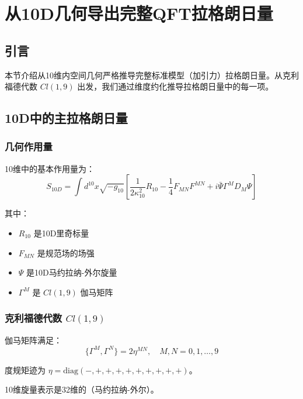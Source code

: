 \section{从10D几何导出完整QFT拉格朗日量}
\label{sec:qft_lagrangian_complete}

\subsection{引言}

本节介绍从10维内空间几何严格推导完整标准模型（加引力）拉格朗日量。从克利福德代数 $Cl(1,9)$ 出发，我们通过维度约化推导拉格朗日量中的每一项。

\subsection{10D中的主拉格朗日量}

\subsubsection{几何作用量}

10维中的基本作用量为：
\begin{equation}
    S_{10D} = \int d^{10}x \sqrt{-g_{10}} \left[ \frac{1}{2\kappa_{10}^2}R_{10} - \frac{1}{4}F_{MN}F^{MN} + i\bar{\Psi}\Gamma^M D_M \Psi \right]
\end{equation}

其中：
\begin{itemize}
    \item $R_{10}$ 是10D里奇标量
    \item $F_{MN}$ 是规范场的场强
    \item $\Psi$ 是10D马约拉纳-外尔旋量
    \item $\Gamma^M$ 是 $Cl(1,9)$ 伽马矩阵
\end{itemize}

\subsubsection{克利福德代数 $Cl(1,9)$}

伽马矩阵满足：
\begin{equation}
    \{\Gamma^M, \Gamma^N\} = 2\eta^{MN}, \quad M,N = 0,1,\ldots,9
\end{equation}

度规矩迹为 $\eta = \text{diag}(-,+,+,+,+,+,+,+,+,+)$。

10维旋量表示是32维的（马约拉纳-外尔）。

